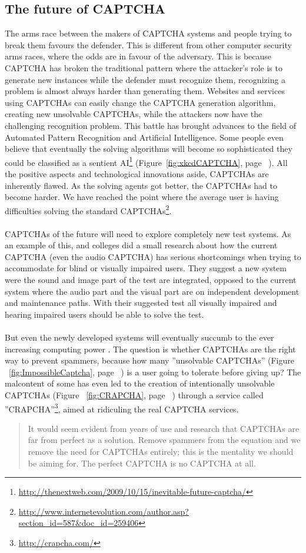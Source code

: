 \documentclass[pdftex,a4paper,12pt,twoside]{report}
\theoremstyle{plain} \newtheorem{theorem}{Theorem} \newtheorem{proposition}{Proposition} \newtheorem{lemma}{Lemma} \newtheorem*{corollary}{Corollary}
\theoremstyle{definition} \newtheorem{definition}{Definition} \newtheorem{conjecture}{Conjecture} \newtheorem*{example}{Example} \newtheorem{algorithm}{Algorithm}
\theoremstyle{remark} \newtheorem*{remark}{Remark} \newtheorem*{note}{Note} \newtheorem{case}{Case}
\begin{document}
\subsection{The future of CAPTCHA}
The arms race between the makers of CAPTCHA systems and people trying to break them favours the defender. This is different from other computer security arms races, where the odds are in favour of the adversary. This is because CAPTCHA has broken the traditional pattern where the attacker's role is to generate new instances while the defender must recognize them, recognizing a problem is almost always harder than generating them. Websites and services using CAPTCHAs can easily change the CAPTCHA generation algorithm, creating new unsolvable CAPTCHAs, while the attackers now have the challenging recognition problem. This battle has brought advances to the field of Automated Pattern Recognition and Artificial Intelligence. Some people even believe that eventually the solving algorithms will become so sophisticated they could be classified as a sentient AI\footnote{\url{http://thenextweb.com/2009/10/15/inevitable-future-captcha/}} (Figure~\ref{fig:xkcdCAPTCHA}, page ~\pageref{fig:xkcdCAPTCHA}). All the positive aspects and technological innovations aside, CAPTCHAs are inherently flawed. As the solving agents got better, the CAPTCHAs had to become harder. We have reached the point where the average user is having difficulties solving the standard CAPTCHAs\footnote{\url{http://www.internetevolution.com/author.asp?section_id=587&doc_id=259406}}. \\\\CAPTCHAs of the future will need to explore completely new test systems. As an example of this, \citep{Sauer2008} and colleges did a small research about how the current CAPTCHA (even the audio CAPTCHA) has serious shortcomings when trying to accommodate for blind or visually impaired users. They suggest a new system were the sound and image part of the test are integrated, opposed to the current system where the audio part and the visual part are on independent development and maintenance paths. With their suggested test all visually impaired and hearing impaired users should be able to solve the test.\\\\
But even the newly developed systems will eventually succumb to the ever increasing computing power \citep{Beede2010}. The question is whether CAPTCHAs are the right way to prevent spammers, because how many ''unsolvable CAPTCHAs'' (Figure ~\ref{fig:ImpossibleCaptcha}, page ~\pageref{fig:ImpossibleCaptcha}) is a user going to tolerate before giving up? The malcontent of some has even led to the creation of intentionally unsolvable CAPTCHAs (Figure ~\ref{fig:CRAPCHA}, page ~\pageref{fig:CRAPCHA}) through a service called ''CRAPCHA''\footnote{\url{http://crapcha.com/}}, aimed at ridiculing the real CAPTCHA services.
\begin{quote}
It would seem evident from years of use and research that CAPTCHAs are far from perfect as a solution. Remove spammers from the equation and we remove the need for CAPTCHAs entirely; this is the mentality we should be aiming for. The perfect CAPTCHA is no CAPTCHA at all. \citep{Bushell2011}
\end{quote}\newpage
\cleardoublepage
\end{document}
